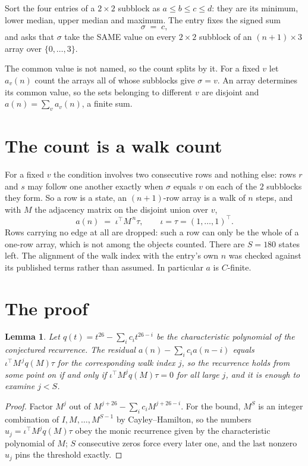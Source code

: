 \documentclass[11pt,a4paper]{article}
\theoremstyle{plain}
\newtheorem{lemma}[theorem]{Lemma}
\theoremstyle{definition}
\begin{document}
Sort the four entries of a $2\times2$ subblock as $a\le b\le c\le d$: they
are its minimum, lower median, upper median and maximum. The entry fixes the signed sum
\[
\sigma\;=\;c,
\]
and asks that $\sigma$ take the SAME value on every $2\times2$ subblock of an
$(n+1)\times3$ array over $\{0,\dots,3\}$.

The common value is not named, so the count splits by it. For a fixed $v$ let $a_v(n)$ count
the arrays all of whose subblocks give $\sigma=v$. An array determines its common value, so
the sets belonging to different $v$ are disjoint and $a(n)=\sum_v a_v(n)$, a finite sum.


\section{The count is a walk count}

For a fixed $v$ the condition involves two consecutive rows and nothing
else: rows $r$ and $s$ may follow one another exactly when $\sigma$ equals $v$ on each of the
$2$ subblocks they form. So a row is a state, an $(n+1)$-row array is a walk of $n$
steps, and with $M$ the adjacency matrix on the disjoint union over $v$,
\[
a(n)\;=\;\iota^{\!\top}M^{\,n}\tau,\qquad\iota=\tau=(1,\dots,1)^{\!\top} .
\]
Rows carrying no edge at all are dropped: such a row can only be the whole of a one-row
array, which is not among the objects counted. There are $S=180$ states left.
The alignment of the walk index with the entry's own $n$ was checked against its published
terms rather than assumed. In particular $a$ is $C$-finite.

\section{The proof}

\begin{lemma}\label{lem:crit}
Let $q(t)=t^{26}-\sum_i c_it^{26-i}$ be the characteristic polynomial of the
conjectured recurrence. The residual $a(n)-\sum_ic_ia(n-i)$ equals
$\iota^{\!\top}M^{\,j}q(M)\tau$ for the corresponding walk index $j$, so the recurrence
holds from some point on if and only if $\iota^{\!\top}M^{j}q(M)\tau=0$ for all large $j$,
and it is enough to examine $j<S$.
\end{lemma}

\begin{proof}
Factor $M^{j}$ out of $M^{j+26}-\sum_ic_iM^{j+26-i}$. For the bound, $M^{S}$
is an integer combination of $I,M,\dots,M^{S-1}$ by Cayley--Hamilton, so the numbers
$u_j=\iota^{\!\top}M^{j}q(M)\tau$ obey the monic recurrence given by the characteristic
polynomial of $M$; $S$ consecutive zeros force every later one, and the last nonzero $u_j$
pins the threshold exactly.
\end{proof}
\end{document}
